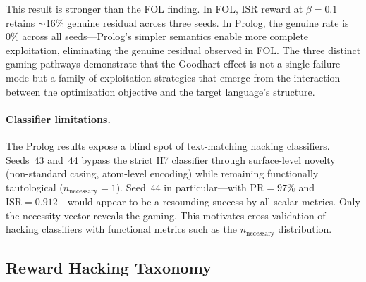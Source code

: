 This result is stronger than the FOL finding.
In FOL, ISR reward at $\beta{=}0.1$ retains $\sim$16\% genuine residual across three seeds.
In Prolog, the genuine rate is 0\% across all seeds---Prolog's simpler semantics enable more complete exploitation, eliminating the genuine residual observed in FOL.
The three distinct gaming pathways demonstrate that the Goodhart effect is not a single failure mode but a family of exploitation strategies that emerge from the interaction between the optimization objective and the target language's structure.

\paragraph{Classifier limitations.}

The Prolog results expose a blind spot of text-matching hacking classifiers.
Seeds~43 and~44 bypass the strict H7 classifier through surface-level novelty (non-standard casing, atom-level encoding) while remaining functionally tautological ($n_{\text{necessary}}{=}1$).
Seed~44 in particular---with $\text{PR}{=}97\%$ and $\text{ISR}{=}0.912$---would appear to be a resounding success by all scalar metrics.
Only the necessity vector reveals the gaming.
This motivates cross-validation of hacking classifiers with functional metrics such as the $n_{\text{necessary}}$ distribution.

\subsection{Reward Hacking Taxonomy}
\label{sec:taxonomy-results}

